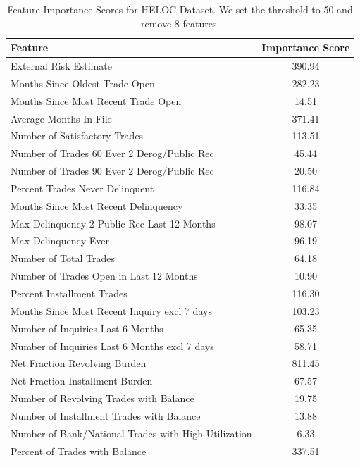 \documentclass{article}
\theoremstyle{plain}
\theoremstyle{definition}
\theoremstyle{remark}
\begin{document}
\begin{table}[h!]
\centering
\caption{Feature Importance Scores for HELOC Dataset. We set the threshold to 50 and remove 8 features.}
\begin{tabular}{lc}
\toprule
\textbf{Feature} & \textbf{Importance Score} \\
\midrule
External Risk Estimate & 390.94 \\
Months Since Oldest Trade Open & 282.23 \\
Months Since Most Recent Trade Open & 14.51 \\
Average Months In File & 371.41 \\
Number of Satisfactory Trades & 113.51 \\
Number of Trades 60 Ever 2 Derog/Public Rec & 45.44 \\
Number of Trades 90 Ever 2 Derog/Public Rec & 20.50 \\
Percent Trades Never Delinquent & 116.84 \\
Months Since Most Recent Delinquency & 33.35 \\
Max Delinquency 2 Public Rec Last 12 Months & 98.07 \\
Max Delinquency Ever & 96.19 \\
Number of Total Trades & 64.18 \\
Number of Trades Open in Last 12 Months & 10.90 \\
Percent Installment Trades & 116.30 \\
Months Since Most Recent Inquiry excl 7 days & 103.23 \\
Number of Inquiries Last 6 Months & 65.35 \\
Number of Inquiries Last 6 Months excl 7 days & 58.71 \\
Net Fraction Revolving Burden & 811.45 \\
Net Fraction Installment Burden & 67.57 \\
Number of Revolving Trades with Balance & 19.75 \\
Number of Installment Trades with Balance & 13.88 \\
Number of Bank/National Trades with High Utilization & 6.33 \\
Percent of Trades with Balance & 337.51 \\
\bottomrule
\end{tabular}
\label{tab:feature_importance}
\end{table}
\end{document}
